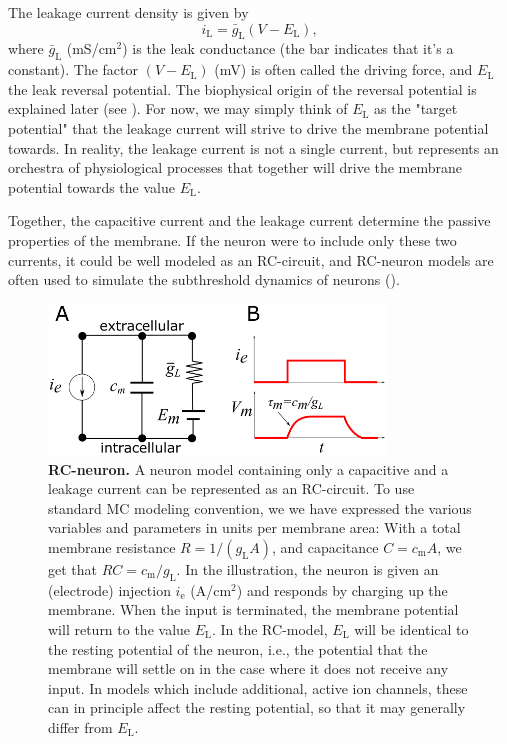 The leakage current density is given by
\begin{equation}
i_{\mathrm{L}} = \bar{g}_{\mathrm{L}} (V - E_{\mathrm{L}}),
\label{eq:Neuron:HHleak}
\end{equation}
where $\bar{g}_{\mathrm{L}}$ (mS/cm$^2$) is the leak conductance (the bar indicates that it's a constant). The factor $(V - E_{\mathrm{L}})$ (mV) is often called the driving force, and $E_{\mathrm{L}}$ the leak reversal potential. The biophysical origin of the reversal potential is explained later (see ). For now, we may simply think of $E_{\mathrm{L}}$ as the "target potential" that the leakage current will strive to drive the membrane potential towards. In reality, the leakage current is not a single current, but represents an orchestra of physiological processes that together will drive the membrane potential towards the value $E_{\mathrm{L}}$. 

Together, the capacitive current and the leakage current determine the passive properties of the membrane. If the neuron were to include only these two currents, it could be well modeled as an RC-circuit, and RC-neuron models are often used to simulate the subthreshold dynamics of neurons (). 

\begin{figure}[!ht]
\begin{center}
\includegraphics[width=0.8\textwidth]{Figures/Neuron/RCneuron.png}
\end{center}
\caption{\textbf{RC-neuron.}  A neuron model containing only a capacitive and a leakage current can be represented as an RC-circuit. To use standard MC modeling convention, we we have expressed the various variables and parameters in units per membrane area: With a total membrane resistance $R = 1/(g_{\mathrm{L}} A)$, and capacitance $C = c_{\mathrm{m}}A$, we get that $RC = c_{\mathrm{m}}/g_{\mathrm{L}}$. In the illustration, the neuron is given an (electrode) injection $i_{\mathrm{e}}$ (A/cm$^2$) and responds by charging up the membrane. When the input is terminated, the membrane potential will return to the value $E_{\mathrm{L}}$. In the RC-model, $E_{\mathrm{L}}$ will be identical to the resting potential of the neuron, i.e., the potential that the membrane will settle on in the case where it does not receive any input. In models which include additional, active ion channels, these can in principle affect the resting potential, so that it may generally differ from $E_{\mathrm{L}}$.
}
\label{fig:Neuron:RC}
\end{figure}



